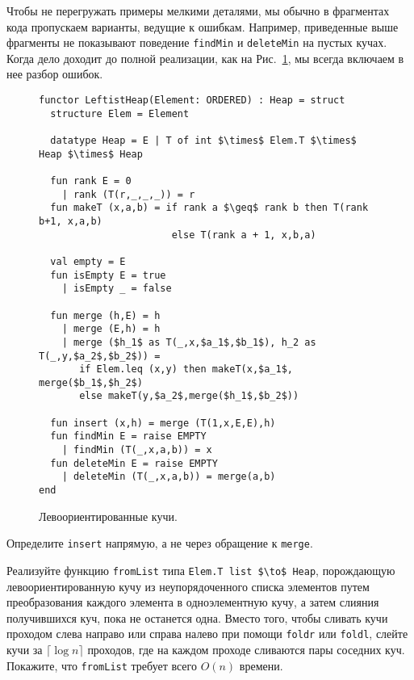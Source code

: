 \begin{remark}
  Чтобы не перегружать примеры мелкими деталями, мы обычно в
  фрагментах кода пропускаем варианты, ведущие к ошибкам. Например,
  приведенные выше фрагменты не показывают поведение
  \lstinline!findMin! и \lstinline!deleteMin! на пустых кучах.  Когда
  дело доходит до полной реализации, как на Рис.~\ref{fig:3.2}, мы
  всегда включаем в нее разбор ошибок.
\end{remark}

\begin{figure}
\begin{lstlisting}
functor LeftistHeap(Element: ORDERED) : Heap = struct
  structure Elem = Element

  datatype Heap = E | T of int $\times$ Elem.T $\times$ Heap $\times$ Heap

  fun rank E = 0
    | rank (T(r,_,_,_)) = r
  fun makeT (x,a,b) = if rank a $\geq$ rank b then T(rank b+1, x,a,b)
                       else T(rank a + 1, x,b,a)

  val empty = E
  fun isEmpty E = true
    | isEmpty _ = false

  fun merge (h,E) = h
    | merge (E,h) = h
    | merge ($h_1$ as T(_,x,$a_1$,$b_1$), h_2 as T(_,y,$a_2$,$b_2$)) =
       if Elem.leq (x,y) then makeT(x,$a_1$, merge($b_1$,$h_2$)
       else makeT(y,$a_2$,merge($h_1$,$b_2$))

  fun insert (x,h) = merge (T(1,x,E,E),h)
  fun findMin E = raise EMPTY
    | findMin (T(_,x,a,b)) = x
  fun deleteMin E = raise EMPTY
    | deleteMin (T(_,x,a,b)) = merge(a,b)
end
\end{lstlisting}

  \caption{Левоориентированные кучи.}
  \label{fig:3.2}
\end{figure}

\begin{exercise}\label{ex:3.2}
  Определите \lstinline!insert! напрямую, а не через обращение к \lstinline!merge!.
\end{exercise}

\begin{exercise}\label{ex:3.3}
  Реализуйте функцию \lstinline!fromList! типа \lstinline!Elem.T list $\to$ Heap!,
  порождающую левоориентированную кучу из неупорядоченного списка
  элементов путем преобразования каждого элемента в одноэлементную
  кучу, а затем слияния получившихся куч, пока не останется
  одна. Вместо того, чтобы сливать кучи проходом слева направо или
  справа налево при помощи \lstinline!foldr! или \lstinline!foldl!,
  слейте кучи за $\lceil \log n \rceil$ проходов, где на каждом
  проходе сливаются пары соседних куч. Покажите, что
  \lstinline!fromList! требует всего $O(n)$ времени.
\end{exercise}

